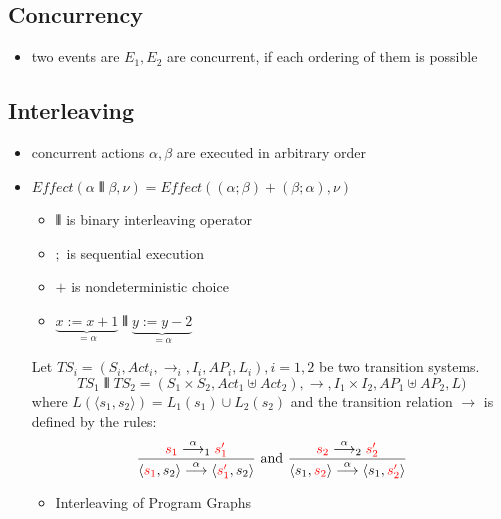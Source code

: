\documentclass[a4paper, 10pt]{article}
\begin{document}
\subsection*{Concurrency}
\begin{itemize}
    \item two events are $E_1, E_2$ are concurrent, if each ordering of them is possible
\end{itemize}

\subsection*{Interleaving}
\begin{itemize}
    \item concurrent actions $\alpha,\beta$ are executed in arbitrary order
    \item $Effect(\alpha \interleave \beta,\nu) = Effect((\alpha;\beta)+(\beta;\alpha),\nu)$
    \begin{itemize}
        \item $\interleave$  is binary interleaving operator
        \item $;$ is sequential execution
        \item $+$ is nondeterministic choice
        \item $\underset{=\alpha}{\underbrace{x:=x+1}} \interleave \underset{=\alpha}{\underbrace{y:=y-2}}$ \\
        \begin{center}
        \scalebox{.8}{}
        \end{center}
    \end{itemize}
    \begin{shaded}
        Let $TS_i=(S_i,Act_i,\to_i,I_i,AP_i,L_i), i=1,2$ be two transition systems.
        \[ TS_1\interleave TS_2 = (S_1\times S_2,Act_1\uplus Act_2),\to,I_1\times I_2,AP_1\uplus AP_2, L) \]
        where $L(\langle s_1,s_2\rangle)=L_1(s_1) \cup L_2(s_2)$ and the transition relation $\to$ is defined by the rules:
        \[
        \frac{\textcolor{red}{s_1}\overset{\alpha}{\longrightarrow}_1 \textcolor{red}{s'_1}}
        {\langle\textcolor{red}{s_1},s_2\rangle \overset{\alpha}{\longrightarrow} \langle\textcolor{red}{s'_1},s_2\rangle}
        \textrm{ and }
        \frac{\textcolor{red}{s_2}\overset{\alpha}{\longrightarrow}_2 \textcolor{red}{s'_2}}
        {\langle s_1,\textcolor{red}{s_2}\rangle \overset{\alpha}{\longrightarrow} \langle s_1,\textcolor{red}{s'_2}\rangle}
        \]
    \end{shaded}
    \begin{itemize}
        \item Interleaving of Program Graphs\\

\end{itemize}
\end{itemize}
\end{document}

